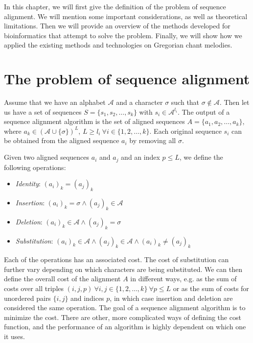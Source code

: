 In this chapter, we will first give the definition of the problem of sequence alignment. We will mention some important considerations,
as well as theoretical limitations. Then we will provide an overview of the methods developed for bioinformatics that attempt to solve
the problem. Finally, we will show how we applied the existing methods and technologies on Gregorian chant melodies.

\section{The problem of sequence alignment}

Assume that we have an alphabet $\mathcal{A}$ and a character $\sigma$ such that $\sigma \notin \mathcal{A}$. Then let us have a set
of sequences $S = \{s_1, s_2, \dots, s_k\}$ with $s_i \in \mathcal{A}^{l_i}$. The output of a sequence alignment algorithm is the set of
aligned sequences $A = \{a_1, a_2, \dots, a_k\}$, where $a_k \in (\mathcal{A}\cup\{\sigma\})^L$, $L \geq l_i \:\forall i\in\{1, 2, \dots, k\}$.
Each original sequence $s_i$ can be obtained from the aligned sequence $a_i$ by removing all $\sigma$.

Given two aligned sequences $a_i$ and $a_j$ and an index $p \leq L$, we define the following operations:

\begin{itemize}
    \item \emph{Identity}: $(a_i)_k = (a_j)_k$
    \item \emph{Insertion}: $(a_i)_k = \sigma \land (a_j)_k \in \mathcal{A}$
    \item \emph{Deletion}: $(a_i)_k \in \mathcal{A} \land (a_j)_k = \sigma$
    \item \emph{Substitution}: $(a_i)_k \in \mathcal{A} \land (a_j)_k \in \mathcal{A} \land (a_i)_k \neq (a_j)_k$
\end{itemize}

Each of the operations has an associated cost. The cost of substitution can further vary depending on which characters are being
substituted. We can then define the overall cost of the alignment $A$ in different ways, e.g. as the sum of costs over all triples
$(i, j, p) \: \forall i, j \in \{1, 2, \dots, k\} \: \forall p \leq L$ or as the sum of costs for unordered pairs $\{i, j\}$ and indices $p$,
in which case insertion and deletion are considered the same operation. The goal of a sequence alignment algorithm is to minimize the cost.
There are other, more complicated ways of defining the cost  function, and the performance of an algorithm is highly dependent on which one it uses.

